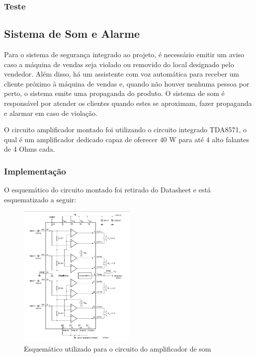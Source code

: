\subsubsection{Teste}


\subsection{Sistema de Som e Alarme}

Para o sistema de segurança integrado ao projeto, é necessário emitir um aviso caso a máquina de vendas seja violado ou removido do local designado pelo vendedor. Além disso, há um assistente com voz automática para receber um cliente próximo à máquina de vendas e, quando não houver nenhuma pessoa por perto, o sistema emite uma propaganda do produto. O sistema de som é responsável por atender os clientes quando estes se aproximam, fazer propaganda e alarmar em caso de violação.

O circuito amplificador montado foi utilizando o circuito integrado TDA8571, o qual é um amplificador dedicado capaz de oferecer 40 W para até 4 alto falantes de 4 Ohms cada.

\subsubsection{Implementação}

O esquemático do circuito montado foi retirado do Datasheet \cite{mq2} e está esquematizado a seguir:

\begin{figure}[H]
	\centering
    \includegraphics[width=0.5\textwidth]{figuras/circuito_TDA}
    \caption{Esquemático utilizado para o circuito do amplificador de som}
    \label{fig:circuito_TDA}
\end{figure}

